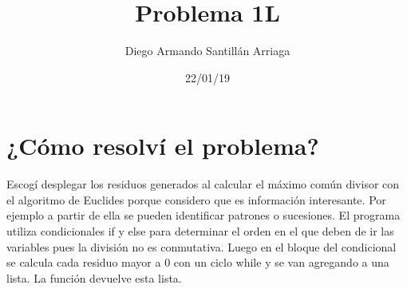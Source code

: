 \documentclass[letterpaper, 12pt, oneside]{article}%
\title{\Huge Problema 1L}
\author{Diego Armando Santillán Arriaga}
\date{22/01/19}
\begin{document}
\maketitle
\newpage
\section*{¿Cómo resolví el problema?}
Escogí desplegar los residuos generados al calcular el máximo común divisor con el algoritmo de Euclides porque considero que es información interesante. Por ejemplo a partir de ella se pueden identificar patrones o sucesiones.
El programa utiliza condicionales if y else para determinar el orden en el que deben de ir las variables pues la división no es conmutativa. Luego en el bloque del condicional se calcula cada residuo mayor a 0 con un ciclo while y se van agregando a una lista. La función devuelve esta lista. 
  
\end{document}
